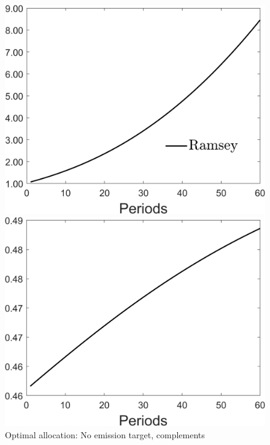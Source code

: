 \begin{figure}[h!!]
	\centering
	\caption{Optimal allocation: No emission target, complements }\label{fig:optallo_comp_onlyR}
	\begin{minipage}[]{0.32\textwidth}
		\includegraphics[width=1\textwidth]{../codding_model/Own/figures/Rep_agent/staticonlyRam_separate_c_periods59_eppsilon0.40_zeta1.40_Ad08_Ac04_thetac0.70_thetad0.56_HetGrowth1_tauul0.181_util0_withtarget0_lgd1.png}
	\end{minipage}
	\begin{minipage}[]{0.32\textwidth}
		\includegraphics[width=1\textwidth]{../codding_model/Own/figures/Rep_agent/staticonlyRam_separate_hh_periods59_eppsilon0.40_zeta1.40_Ad08_Ac04_thetac0.70_thetad0.56_HetGrowth1_tauul0.181_util0_withtarget0_lgd0.png}

\end{minipage}
\end{figure}
